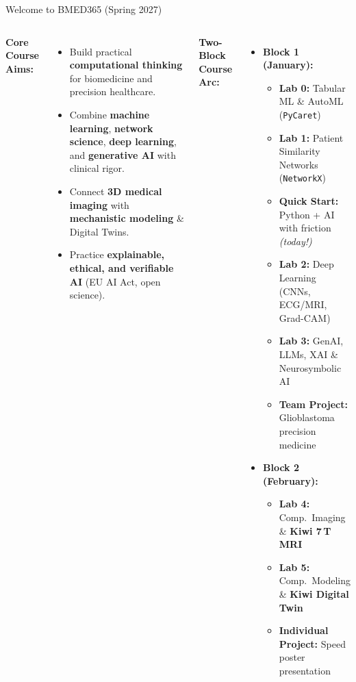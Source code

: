 \documentclass[aspectratio=169, 10pt]{beamer}
\begin{document}
\begin{frame}{Welcome to BMED365 (Spring 2027)}
    \begin{columns}[T,onlytextwidth]
        \textbf{Core Course Aims:}
        \begin{itemize}
            \item Build practical \textbf{computational thinking} for biomedicine and precision healthcare.
            \item Combine \textbf{machine learning}, \textbf{network science}, \textbf{deep learning}, and \textbf{generative AI} with clinical rigor.
            \item Connect \textbf{3D medical imaging} with \textbf{mechanistic modeling} \& Digital Twins.
            \item Practice \textbf{explainable, ethical, and verifiable AI} (EU AI Act, open science).
        \end{itemize}

        \textbf{Two-Block Course Arc:}
        {\footnotesize
        \begin{itemize}
            \item \textbf{Block 1 (January):}
            \begin{itemize}\footnotesize
                \item \textbf{Lab 0:} Tabular ML \& AutoML (\texttt{PyCaret})
                \item \textbf{Lab 1:} Patient Similarity Networks (\texttt{NetworkX})
                \item \textbf{Quick Start:} Python + AI with friction \textit{(today!)}
                \item \textbf{Lab 2:} Deep Learning (CNNs, ECG/MRI, Grad-CAM)
                \item \textbf{Lab 3:} GenAI, LLMs, XAI \& Neurosymbolic AI
                \item \textbf{Team Project:} Glioblastoma precision medicine
            \end{itemize}
            \item \textbf{Block 2 (February):}
            \begin{itemize}\footnotesize
                \item \textbf{Lab 4:} Comp.\ Imaging \& \textbf{Kiwi 7\,T MRI}
                \item \textbf{Lab 5:} Comp.\ Modeling \& \textbf{Kiwi Digital Twin}
                \item \textbf{Individual Project:} Speed poster presentation
            \end{itemize}
        \end{itemize}
        }
    \end{columns}
\end{frame}
\end{document}

